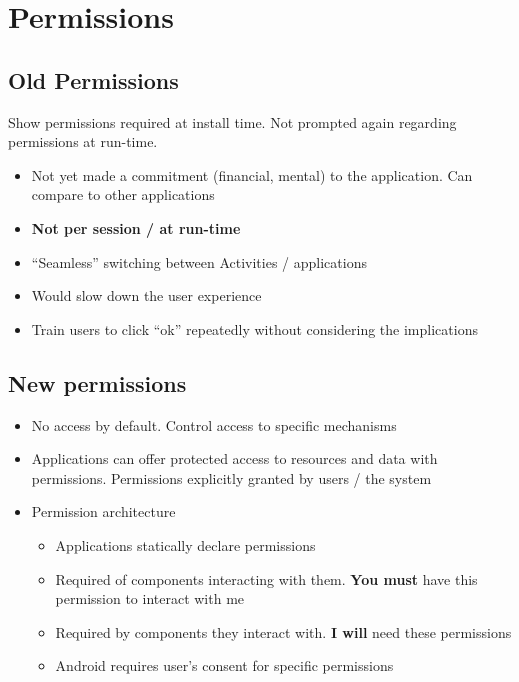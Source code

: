 \documentclass{article}
\begin{document}
\tableofcontents

\newpage

\section{Permissions}

\subsection{Old	Permissions}

\begin{flushleft}
Show permissions required at install time. Not prompted again regarding permissions at run-time.
\begin{itemize}
  \item Not yet made a commitment (financial, mental) to the application. Can compare to other applications 
  \item \textbf{Not per session / at run-time }
  \item “Seamless” switching between Activities / applications 
  \item Would slow down the user experience 
  \item Train users to click “ok” repeatedly without considering the implications
\end{itemize}
\end{flushleft}

\subsection{New permissions}

\begin{itemize}
  \item No access by default. Control access to specific mechanisms
  \item Applications can offer protected access to resources and data with permissions. Permissions explicitly granted by users / the system
  \item Permission architecture
  \begin{itemize}
    \item Applications statically declare permissions 
    \item Required of components interacting with them. \textbf{You must} have this permission to interact with me 
    \item Required by components they interact with. \textbf{I will} need these permissions 
    \item Android requires user’s consent for specific permissions
  \end{itemize}
\end{itemize}
\end{document}
